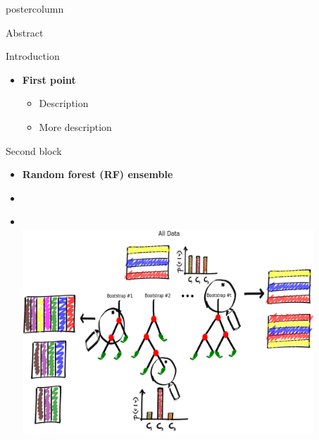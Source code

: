 \documentclass[final]{beamer}
\begin{document}
\begin{frame}
\begin{columns}
\begin{column}{.33\textwidth}
\begin{beamercolorbox}[center,wd=\textwidth]{postercolumn}
\begin{minipage}[T]{.95\textwidth}
{            %
            \begin{block}{Abstract}
              \lipsum[1-2]
            \end{block}
            \begin{block}{Introduction}
              \begin{itemize}
               \item \textbf{\color{orounam}First point }
               \begin{itemize}
               		\item Description 
               		\item More description
               \end{itemize}  
              \end{itemize}                 
            \end{block}
            \begin{block}{Second block}
            \begin{itemize}
            	\item \textbf{\color{orounam}Random forest (RF) ensemble}
            	\item []
            	\item []
            	\begin{columns}
            		\begin{column}{.54\textwidth}
            		\\
            			\includegraphics[width = 0.9\textwidth, height = 0.15\textheight]{images/framework/RF_train.png}
            		\end{column}
            		\begin{column}{.44\textwidth}
            		\\

\end{column}
\end{columns}
\end{itemize}
\end{block}}
\end{minipage}
\end{beamercolorbox}
\end{column}
\end{columns}
\end{frame}
\end{document}
